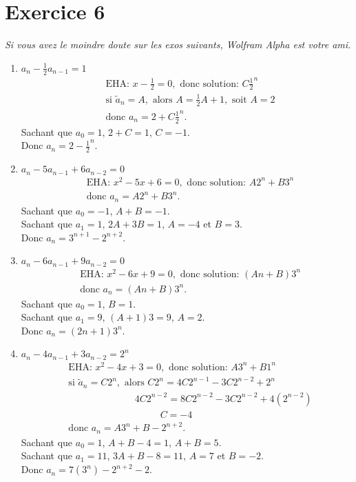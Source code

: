 \documentclass[fontsize=10pt]{article}
\begin{document}
\section*{Exercice 6}
\textit{Si vous avez le moindre doute sur les exos suivants, Wolfram Alpha est votre ami.}
\begin{enumerate}
\item $a_n - \frac{1}{2}a_{n-1} = 1$
\begin{align*}
& \text{EHA: } x - \frac{1}{2} = 0, \text{ donc solution: }C\frac{1}{2}^n\\
& \text{si } \tilde{a}_n = A, \text{ alors } A = \frac{1}{2}A + 1, \text{ soit } A = 2\\
& \text{donc } a_n = 2 + C\frac{1}{2}^n.
\end{align*}
Sachant que $a_0 = 1$, $2 + C = 1$, $C = -1$.\\
Donc $a_n = 2 - \frac{1}{2}^n$.

\item $a_n - 5a_{n-1} + 6a_{n-2} = 0$
\begin{align*}
& \text{EHA: } x^2 - 5x + 6 = 0, \text{ donc solution: }A2^n + B3^n\\
& \text{donc } a_n = A2^n + B3^n.
\end{align*}
Sachant que $a_0 = -1$, $A+B = -1$.\\
Sachant que $a_1 = 1$, $2A+3B = 1$, $A=-4$ et $B=3$.\\
Donc $a_n = 3^{n+1} - 2^{n+2}$.

\item $a_n - 6a_{n-1} + 9a_{n-2} = 0$
\begin{align*}
& \text{EHA: } x^2 - 6x + 9 = 0, \text{ donc solution: } (An + B)3^n\\
& \text{donc } a_n = (An + B)3^n.
\end{align*}
Sachant que $a_0 = 1$, $B = 1$.\\
Sachant que $a_1 = 9$, $(A+1)3 = 9$, $A=2$.\\
Donc $a_n = (2n + 1)3^n$.

\item $a_n - 4a_{n-1} + 3a_{n-2} = 2^n$
\begin{align*}
& \text{EHA: } x^2 - 4x + 3 = 0, \text{ donc solution: } A3^n + B1^n\\
& \text{si } \tilde{a}_n = C2^n, \text{ alors } C2^n = 4C2^{n-1} - 3C2^{n-2} + 2^n\\
& \phantom{aaaaaaaaaaaaa} 4C2^{n-2} = 8C2^{n-2} - 3C2^{n-2} + 4(2^{n-2})\\
& \phantom{aaaaaaaaaaaaaaaaaa} C = -4\\
& \text{donc } a_n = A3^n + B - 2^{n+2}.
\end{align*}
Sachant que $a_0 = 1$, $A+B-4 = 1$, $A+B = 5$.\\
Sachant que $a_1 = 11$, $3A+B-8 = 11$, $A = 7$ et $B = -2$.\\
Donc $a_n = 7(3^n)-2^{n+2} - 2$.

\end{enumerate}
\end{document}
